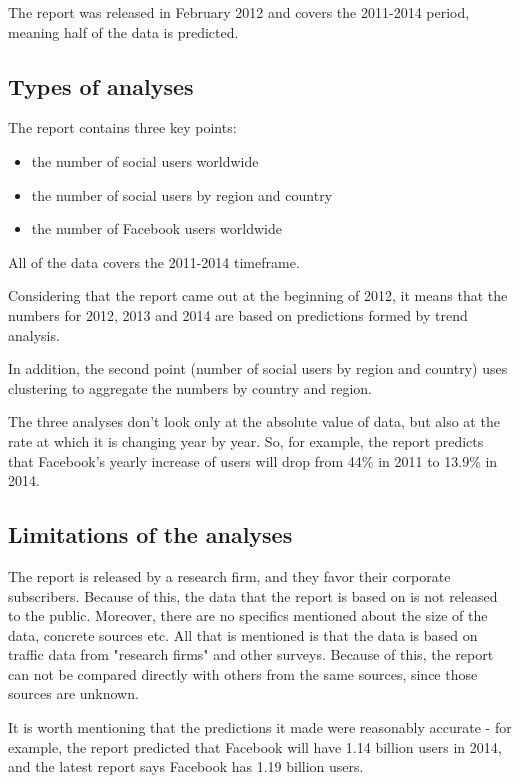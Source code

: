 \documentclass{acm_proc_10ptArticle-sp}
\begin{document}
The report was released in February 2012 and covers the 2011-2014 period, meaning half of the data is predicted.


\subsection{Types of analyses}
The report contains three key points:

\begin{itemize}
\item the number of social users worldwide
\item the number of social users by region and country
\item the number of Facebook users worldwide
\end{itemize}

All of the data covers the 2011-2014 timeframe.

Considering that the report came out at the beginning of 2012, it means that the numbers for 2012, 2013 and 2014 are based on predictions formed by trend analysis.

In addition, the second point (number of social users by region and country) uses clustering to aggregate the numbers by country and region.

The three analyses don't look only at the absolute value of data, but also at the rate at which it is changing year by year. So, for example, the report predicts that Facebook's yearly increase of users will drop from 44\% in 2011 to 13.9\% in 2014.


\subsection{Limitations of the analyses}

The report is released by a research firm, and they favor their corporate subscribers. Because of this, the data that the report is based on is not released to the public. Moreover, there are no specifics mentioned about the size of the data, concrete sources etc. All that is mentioned is that the data is based on traffic data from "research firms" and other surveys. Because of this, the report can not be compared directly with others from the same sources, since those sources are unknown.

It is worth mentioning that the predictions it made were reasonably accurate - for example, the report predicted that Facebook will have 1.14 billion users in 2014, and the latest report says Facebook has 1.19 billion users.
\end{document}
